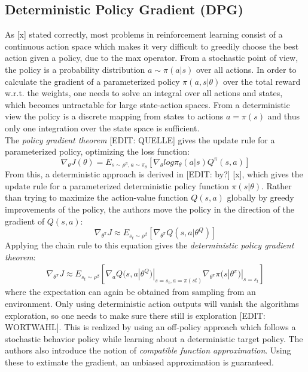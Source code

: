 \subsection{Deterministic Policy Gradient (DPG)}
\label{sec:DPG}
\nocite{lillicrap2015continuous}
As [x] stated correctly, most problems in reinforcement learning consist of a continuous action space which makes it very difficult to greedily choose the best action given a policy, due to the max operator. From a stochastic point of view, the policy is a probability distribution $a\sim\pi(a|s)$ over all actions. In order to calculate the gradient of a parameterized policy $\pi(a,s|\theta)$ over the total reward w.r.t. the weights, one needs to solve an integral over all actions and states, which becomes untractable for large state-action spaces.
From a deterministic view the policy is a discrete mapping from states to actions $a=\pi(s)$ and thus only one integration over the state space is sufficient.\\ 
The \textit{policy gradient theorem} [EDIT: QUELLE] gives the update rule for a parameterized policy, optimizing the loss function: 
\[
\nabla_{\theta}J(\theta)=E_{s\sim\rho^\pi,a\sim\pi_\theta}
\left[\nabla_\theta log \pi_\theta(a|s)Q^\pi(s,a)\right] 
\]
From this, a deterministic approach is derived in [EDIT: by?] [x], which gives the update rule for a parameterized deterministic policy function $\pi(s|\theta)$. Rather than trying to maximize the action-value function $Q(s,a)$ globally by greedy improvements of the policy, the authors move the policy in the direction of the gradient of $Q(s,a)$:
\[
\nabla_{\theta^\pi}J\approx E_{s_t\sim\rho^\beta}\left[\nabla_{\theta^\pi}Q(s,a|\theta^Q)\right]
\]
Applying the chain rule to this equation gives the \textit{deterministic policy gradient theorem}:
\begin{align*}
\nabla_{\theta^\pi}J\approx E_{s_t\sim\rho^\beta}\left[\nabla_aQ(s,a|\theta^Q)|_{s=s_t,a=\pi(st)} \nabla_{\theta^\pi}\pi(s|\theta^\pi)|_{s=s_t}\right]
\end{align*}
where the expectation can again be obtained from sampling from an environment.
Only using deterministic action outputs will vanish the algorithms exploration, so one needs to make sure there still is exploration [EDIT: WORTWAHL]. This is realized by using an off-policy approach which follows a stochastic behavior policy while learning about a deterministic target policy. The authors also introduce the notion of \textit{compatible function approximation}. Using these to extimate the gradient, an unbiased approximation is guaranteed.\\
